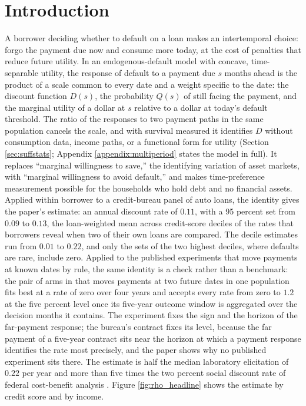 \section{Introduction}\label{sec:intro}

A borrower deciding whether to default on a loan makes an intertemporal choice: forgo the payment due now and consume more today, at the cost of penalties that reduce future utility. In an endogenous-default model with concave, time-separable utility, the response of default to a payment due $s$ months ahead is the product of a scale common to every date and a weight specific to the date: the discount function $D(s)$, the probability $Q(s)$ of still facing the payment, and the marginal utility of a dollar at $s$ relative to a dollar at today's default threshold. The ratio of the responses to two payment paths in the same population cancels the scale, and with survival measured it identifies $D$ without consumption data, income paths, or a functional form for utility (Section \ref{sec:suffstats}; Appendix \ref{appendix:multiperiod} states the model in full). It replaces ``marginal willingness to save,'' the identifying variation of asset markets, with ``marginal willingness to avoid default,'' and makes time-preference measurement possible for the households who hold debt and no financial assets. Applied within borrower to a credit-bureau panel of auto loans, the identity gives the paper's estimate: an annual discount rate of $0.11$, with a 95 percent set from $0.09$ to $0.13$, the loan-weighted mean across credit-score deciles of the rates that borrowers reveal when two of their own loans are compared. The decile estimates run from $0.01$ to $0.22$, and only the sets of the two highest deciles, where defaults are rare, include zero. Applied to the published experiments that move payments at known dates by rule, the same identity is a check rather than a benchmark: the pair of arms in \citet{dobbie_targeted_2020} that moves payments at two future dates in one population fits best at a rate of zero over four years and accepts every rate from zero to $1.2$ at the five percent level once its five-year outcome window is aggregated over the decision months it contains. The experiment fixes the sign and the horizon of the far-payment response; the bureau's contract fixes its level, because the far payment of a five-year contract sits near the horizon at which a payment response identifies the rate most precisely, and the paper shows why no published experiment sits there. The estimate is half the median laboratory elicitation of $0.22$ per year \citep{cohen_measuring_2020} and more than five times the two percent social discount rate of federal cost-benefit analysis \citep{the_white_house_biden-harris_2023}. Figure \ref{fig:rho_headline} shows the estimate by credit score and by income.

